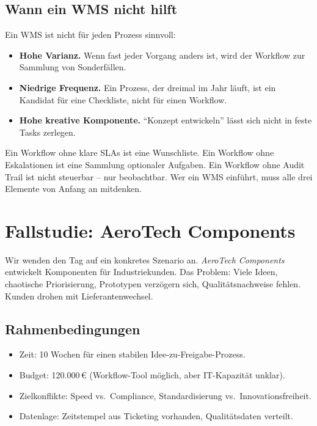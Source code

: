 \documentclass[11pt,a4paper,oneside]{article}
\newcommand{\fachbegriff}[1]{\textbf{#1}}
\begin{document}
\subsection{Wann ein WMS nicht hilft}

Ein WMS ist nicht für jeden Prozess sinnvoll:

\begin{itemize}
  \item \fachbegriff{Hohe Varianz.} Wenn fast jeder Vorgang anders ist, wird der Workflow zur Sammlung von Sonderfällen.
  \item \fachbegriff{Niedrige Frequenz.} Ein Prozess, der dreimal im Jahr läuft, ist ein Kandidat für eine Checkliste, nicht für einen Workflow.
  \item \fachbegriff{Hohe kreative Komponente.} ``Konzept entwickeln'' lässt sich nicht in feste Tasks zerlegen.
\end{itemize}

\begin{merkbox}
Ein Workflow ohne klare SLAs ist eine Wunschliste. Ein Workflow ohne Eskalationen ist eine Sammlung optionaler Aufgaben. Ein Workflow ohne Audit Trail ist nicht steuerbar -- nur beobachtbar. Wer ein WMS einführt, muss alle drei Elemente von Anfang an mitdenken.
\end{merkbox}

\section{Fallstudie: AeroTech Components}

Wir wenden den Tag auf ein konkretes Szenario an. \emph{AeroTech Components} entwickelt Komponenten für Industriekunden. Das Problem: Viele Ideen, chaotische Priorisierung, Prototypen verzögern sich, Qualitätsnachweise fehlen. Kunden drohen mit Lieferantenwechsel.

\subsection{Rahmenbedingungen}

\begin{itemize}
  \item Zeit: 10 Wochen für einen stabilen Idee-zu-Freigabe-Prozess.
  \item Budget: 120{.}000\,\euro{} (Workflow-Tool möglich, aber IT-Kapazität unklar).
  \item Zielkonflikte: Speed vs.\ Compliance, Standardisierung vs.\ Innovationsfreiheit.
  \item Datenlage: Zeitstempel aus Ticketing vorhanden, Qualitätsdaten verteilt.
\end{itemize}
\end{document}

